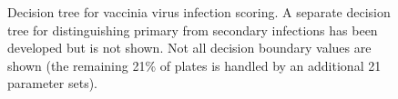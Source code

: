\begin{figure}
  \centering

  \vspace{5mm}
  \footnotesize
  

  \vspace{5mm}
  \caption[Decision tree for vaccinia virus infection scoring.]{Decision tree for vaccinia virus infection scoring. A separate decision tree for distinguishing primary from secondary infections has been developed but is not shown. Not all decision boundary values are shown (the remaining 21\% of plates is handled by an additional 21 parameter sets).}
\end{figure}
